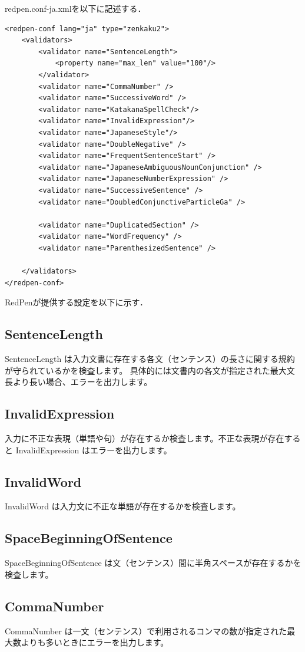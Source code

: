 redpen.conf-ja.xmlを以下に記述する．

\begin{lstlisting}[basicstyle=\ttfamily\footnotesize, frame=single]
<redpen-conf lang="ja" type="zenkaku2">
    <validators>
        <validator name="SentenceLength">
            <property name="max_len" value="100"/>
        </validator>
        <validator name="CommaNumber" />
        <validator name="SuccessiveWord" />
        <validator name="KatakanaSpellCheck"/>
        <validator name="InvalidExpression"/>
        <validator name="JapaneseStyle"/>
        <validator name="DoubleNegative" />
        <validator name="FrequentSentenceStart" />
        <validator name="JapaneseAmbiguousNounConjunction" />
        <validator name="JapaneseNumberExpression" />
        <validator name="SuccessiveSentence" />
        <validator name="DoubledConjunctiveParticleGa" />

        <validator name="DuplicatedSection" />
        <validator name="WordFrequency" />
        <validator name="ParenthesizedSentence" />

    </validators>
</redpen-conf>
\end{lstlisting}
RedPenが提供する設定を以下に示す．
\subsection{SentenceLength}
SentenceLength は入力文書に存在する各文（センテンス）の長さに関する規約が守られているかを検査します。 具体的には文書内の各文が指定された最大文長より長い場合、エラーを出力します。
\subsection{InvalidExpression}
入力に不正な表現（単語や句）が存在するか検査します。不正な表現が存在すると InvalidExpression はエラーを出力します。
\subsection{InvalidWord}
InvalidWord は入力文に不正な単語が存在するかを検査します。
\subsection{SpaceBeginningOfSentence}
SpaceBeginningOfSentence は文（センテンス）間に半角スペースが存在するかを検査します。
\subsection{CommaNumber}
CommaNumber は一文（センテンス）で利用されるコンマの数が指定された最大数よりも多いときにエラーを出力します。
